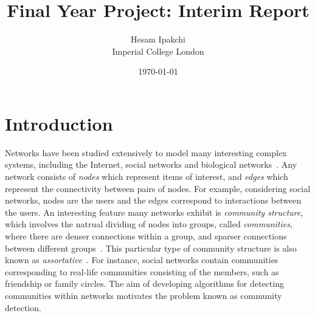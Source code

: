 \documentclass[11pt]{article}
\begin{document}
\nocite{*}


\title{\textbf{Final Year Project: Interim Report}}
\author{Hesam Ipakchi\\Imperial College London}
\date{\today}
\maketitle


\newpage
\thispagestyle{plain}
\mbox{}
\tableofcontents


\newpage
\thispagestyle{plain}
\mbox{}
\listoffigures


\newpage
\thispagestyle{plain}
\mbox{}
\section {Introduction}
\label{sec:introduction}

Networks have been studied extensively to model many interesting complex systems, including the Internet, social networks and biological networks~\cite{New06a,DKM+13}. Any network consists of \textit{nodes} which represent items of interest, and \textit{edges} which represent the connectivity between pairs of nodes. For example, considering social networks, nodes are the users and the edges correspond to interactions between the users. An interesting feature many networks exhibit is \textit{community structure}, which involves the natrual dividing of nodes into groups, called \textit{communities}, where there are denser connections within a group, and sparser connections between different groups~\cite{New06a,DKM+13,For10,New06b}. This particular type of community structure is also known as \textit{assortative}~\cite{DKM+13}. For instance, social networks contain communities corresponding to real-life communities consisting of the members, such as friendship or family circles. The aim of developing algorithms for detecting communities within networks motivates the problem known as community detection.
\end{document}
